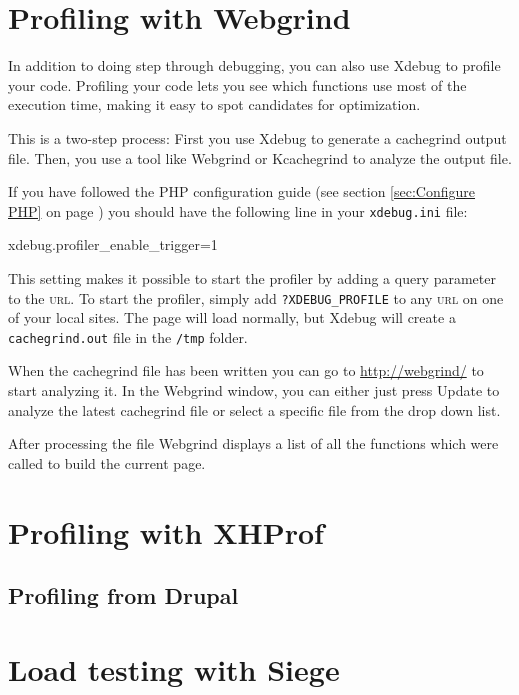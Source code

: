 \documentclass[final,ebook,10pt,twoside,openright]{memoir}
\begin{document}
\section{Profiling with Webgrind}
\label{sec:Profiling with Webgrind}

In addition to doing step through debugging, you can also use Xdebug to profile your code. Profiling your code lets you see which functions use most of the execution time, making it easy to spot candidates for optimization.

This is a two-step process: First you use Xdebug to generate a cachegrind output file. Then, you use a tool like Webgrind or Kcachegrind to analyze the output file.

If you have followed the \textsc{PHP} configuration guide (see section \ref{sec:Configure PHP} on page \pageref{sec:Configure PHP}) you should have the following line in your \verb!xdebug.ini! file:

\begin{squashboxoutput}
xdebug.profiler_enable_trigger=1
\end{squashboxoutput}

This setting makes it possible to start the profiler by adding a query parameter to the \textsc{url}. To start the profiler, simply add \verb!?XDEBUG_PROFILE! to any \textsc{url} on one of your local sites. The page will load normally, but Xdebug will create a \verb!cachegrind.out! file in the \verb!/tmp! folder.


When the cachegrind file has been written you can go to \url{http://webgrind/} to start analyzing it. In the Webgrind window, you can either just press Update to analyze the latest cachegrind file or select a specific file from the drop down list.

After processing the file Webgrind displays a list of all the functions which were called to build the current page.


\section{Profiling with XHProf}

\subsection{Profiling from Drupal}

\section{Load testing with Siege}



\end{document}
